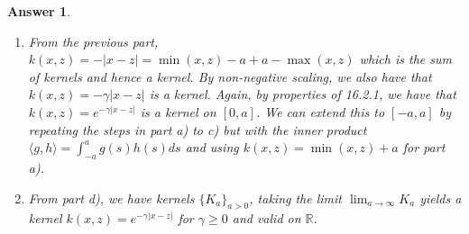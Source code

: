 \documentclass[12pt]{article}
\theoremstyle{colon}
\newtheorem*{answer}{Answer}
\begin{document}
\begin{answer}
\begin{enumerate}[label=\alph*)]
    \item From the previous part, $k(x,z) = - \lvert x - z \rvert = \min(x,z) - a + a - \max(x,z)$ which is the sum of kernels and hence a kernel. By non-negative scaling, we also have that $k(x,z) = -\gamma \lvert x - z \rvert$ is a kernel. Again, by properties of 16.2.1, we have that $k(x,z) = e^{-\gamma \lvert x - z \rvert}$ is a kernel on $[0,a]$. We can extend this to $[-a,a]$ by repeating the steps in part a) to c) but with the inner product $\langle g, h \rangle = \int_{-a}^a g(s) h(s) ds$ and using $k(x,z) = \min(x,z) + a$ for part a).

    \item From part d), we have kernels $\{K_a\}_{a > 0}$, taking the limit $\lim_{a \rightarrow \infty} K_a$ yields a kernel $k(x,z) = e^{-\gamma \lvert x - z \rvert}$ for $\gamma \geq 0$ and valid on $\mathbb{R}$.
  \end{enumerate}
\end{answer}
\end{document}

